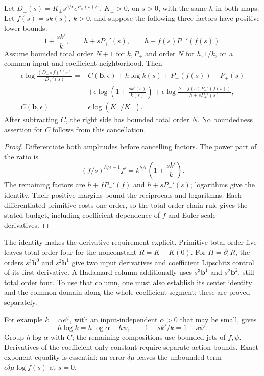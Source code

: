 \begin{lemma}\label{rw:joint-jet-budget}
Let $D_\pm(s)=K_\pm s^{h/\epsilon}e^{P_\pm(s)/\epsilon}$,
$K_\pm>0$, on $s>0$, with the same $h$ in both maps. Let
$f(s)=s k(s)$, $k>0$, and suppose the following three factors have
positive lower bounds:
\[
 1+\frac{s k'}k,\qquad h+sP_+'(s),\qquad
 h+f(s)P_-'(f(s)).
\]
Assume bounded total order $N+1$ for $k,P_\pm$ and order $N$ for
$h,1/k$, on a common input and coefficient neighborhood. Then
\begin{equation}\label{rw:transitions:common-power}
\begin{aligned}
 \epsilon\log\frac{(D_-\circ f)'(s)}{D_+'(s)}
 ={}&C(\mathbf b,\epsilon)+h\log k(s)
       +P_-(f(s))-P_+(s)\\
 &+\epsilon\log\left(1+\frac{s k'(s)}{k(s)}\right)
  +\epsilon\log\frac{h+f(s)P_-'(f(s))}{h+sP_+'(s)},\\
 C(\mathbf b,\epsilon)={}&\epsilon\log(K_-/K_+).
\end{aligned}
\end{equation}
After subtracting $C$, the right side has bounded total order $N$.
No boundedness assertion for $C$ follows from this cancellation.
\end{lemma}
\begin{proof}
Differentiate both amplitudes before cancelling factors. The power part
of the ratio is
\[
 (f/s)^{h/\epsilon-1}f'
       =k^{h/\epsilon}\left(1+\frac{s k'}k\right).
\]
The remaining factors are $h+fP_-'(f)$ and $h+sP_+'(s)$; logarithms
give the identity. Their positive margins bound the reciprocals and
logarithms. Each differentiated primitive costs one order, so the
total-order chain rule gives the stated budget, including coefficient
dependence of $f$ and Euler scale derivatives.
\end{proof}

The identity makes the derivative requirement explicit.  Primitive
total order five leaves total order four for the nonconstant
$R=K-K(0)$.  For $H=\partial_sR$, the orders $s^3\mathbf b^0$ and
$s^2\mathbf b^1$ give two input derivatives and coefficient Lipschitz
control of its first derivative. A Hadamard column additionally uses
$s^3\mathbf b^1$ and $s^2\mathbf b^2$, still total order four.
To use that column, one must also establish its center identity and
the common domain along the whole coefficient segment; these are
proved separately.

For example $k=\alpha e^\psi$, with an input-independent $\alpha>0$
that may be small, gives
\[
 h\log k=h\log\alpha+h\psi,\qquad
 1+s k'/k=1+s\psi'.
\]
Group $h\log\alpha$ with $C$; the remaining compositions use
bounded jets of $f,\psi$.  Derivatives of the coefficient-only
constant require separate action bounds.  Exact exponent equality is
essential: an error $\delta\mu$ leaves the unbounded term
$\epsilon\delta\mu\log f(s)$ at $s=0$.

